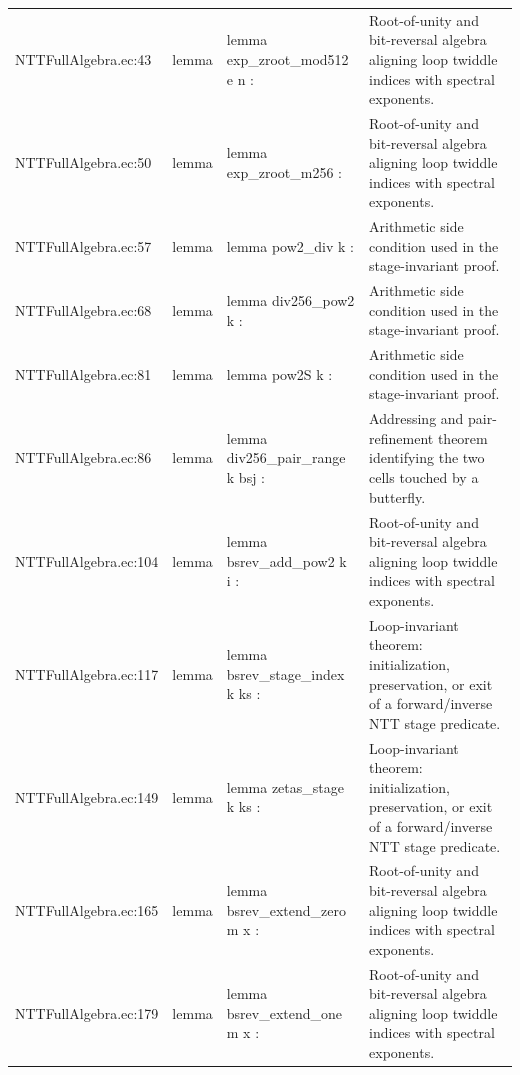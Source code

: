 \documentclass[10pt]{article}
\begin{document}
\begin{longtable}{L{0.11\textwidth}L{0.05\textwidth}L{0.38\textwidth}L{0.42\textwidth}}
NTTFullAlgebra.\allowbreak{}ec:\allowbreak{}43 & lemma & {\ttfamily\scriptsize lemma exp\_zroot\_mod512 e n :} & Root-of-unity and bit-reversal algebra aligning loop twiddle indices with spectral exponents. \\
NTTFullAlgebra.\allowbreak{}ec:\allowbreak{}50 & lemma & {\ttfamily\scriptsize lemma exp\_zroot\_m256 :} & Root-of-unity and bit-reversal algebra aligning loop twiddle indices with spectral exponents. \\
NTTFullAlgebra.\allowbreak{}ec:\allowbreak{}57 & lemma & {\ttfamily\scriptsize lemma pow2\_div k :} & Arithmetic side condition used in the stage-invariant proof. \\
NTTFullAlgebra.\allowbreak{}ec:\allowbreak{}68 & lemma & {\ttfamily\scriptsize lemma div256\_pow2 k :} & Arithmetic side condition used in the stage-invariant proof. \\
NTTFullAlgebra.\allowbreak{}ec:\allowbreak{}81 & lemma & {\ttfamily\scriptsize lemma pow2S k :} & Arithmetic side condition used in the stage-invariant proof. \\
NTTFullAlgebra.\allowbreak{}ec:\allowbreak{}86 & lemma & {\ttfamily\scriptsize lemma div256\_pair\_range k bsj :} & Addressing and pair-refinement theorem identifying the two cells touched by a butterfly. \\
NTTFullAlgebra.\allowbreak{}ec:\allowbreak{}104 & lemma & {\ttfamily\scriptsize lemma bsrev\_add\_pow2 k i :} & Root-of-unity and bit-reversal algebra aligning loop twiddle indices with spectral exponents. \\
NTTFullAlgebra.\allowbreak{}ec:\allowbreak{}117 & lemma & {\ttfamily\scriptsize lemma bsrev\_stage\_index k ks :} & Loop-invariant theorem: initialization, preservation, or exit of a forward/inverse NTT stage predicate. \\
NTTFullAlgebra.\allowbreak{}ec:\allowbreak{}149 & lemma & {\ttfamily\scriptsize lemma zetas\_stage k ks :} & Loop-invariant theorem: initialization, preservation, or exit of a forward/inverse NTT stage predicate. \\
NTTFullAlgebra.\allowbreak{}ec:\allowbreak{}165 & lemma & {\ttfamily\scriptsize lemma bsrev\_extend\_zero m x :} & Root-of-unity and bit-reversal algebra aligning loop twiddle indices with spectral exponents. \\
NTTFullAlgebra.\allowbreak{}ec:\allowbreak{}179 & lemma & {\ttfamily\scriptsize lemma bsrev\_extend\_one m x :} & Root-of-unity and bit-reversal algebra aligning loop twiddle indices with spectral exponents. \\

\end{longtable}
\end{document}
